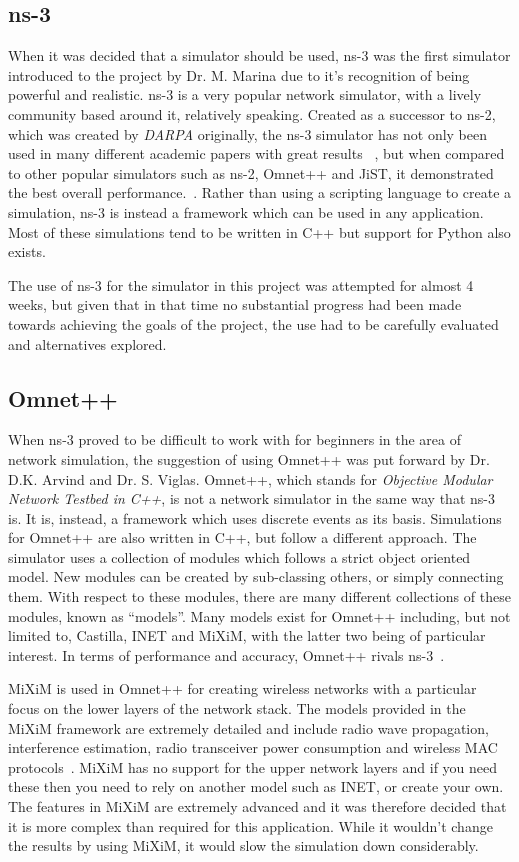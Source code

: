 \documentclass[12pt,a4paper,notitlepage]{article}
\begin{document}
\subsection{ns-3}
When it was decided that a simulator should be used, ns-3 was the first simulator introduced to the project by Dr. M. Marina due to it's recognition of being powerful and realistic. ns-3 is a very popular network simulator, with a lively community based around it, relatively speaking. Created as a successor to ns-2, which was created by \emph{DARPA} originally, the ns-3 simulator has not only been used in many different academic papers with great results ~\cite{highperformancesimulatorofadhocnetworks}, but when compared to other popular simulators such as ns-2, Omnet++ and JiST, it demonstrated the best overall performance.~\cite{networksimulatorcomparison}. Rather than using a scripting language to create a simulation, ns-3 is instead a framework which can be used in any application. Most of these simulations tend to be written in C++ but support for Python also exists. 

The use of ns-3 for the simulator in this project was attempted for almost 4 weeks, but given that in that time no substantial progress had been made towards achieving the goals of the project, the use had to be carefully evaluated and alternatives explored. 

\subsection{Omnet++}
When ns-3 proved to be difficult to work with for beginners in the area of network simulation, the suggestion of using Omnet++ was put forward by Dr. D.K. Arvind and Dr. S. Viglas. Omnet++, which stands for \emph{Objective Modular Network Testbed in C++}, is not a network simulator in the same way that ns-3 is. It is, instead, a framework which uses discrete events as its basis. Simulations for Omnet++ are also written in C++, but follow a different approach. The simulator uses a collection of modules which follows a strict object oriented model. New modules can be created by sub-classing others, or simply connecting them. With respect to these modules, there are many different collections of these modules, known as ``models''. Many models exist for Omnet++ including, but not limited to, Castilla, INET and MiXiM, with the latter two being of particular interest. In terms of performance and accuracy, Omnet++ rivals ns-3~\cite{networksimulatorcomparison}.

MiXiM is used in Omnet++ for creating wireless networks with a particular focus on the lower layers of the network stack. The models provided in the MiXiM framework are extremely detailed and include radio wave propagation, interference estimation, radio transceiver power consumption and wireless MAC protocols~\cite{miximvision}. MiXiM has no support for the upper network layers and if you need these then you need to rely on another model such as INET, or create your own. The features in MiXiM are extremely advanced and it was therefore decided that it is more complex than required for this application. While it wouldn't change the results by using MiXiM, it would slow the simulation down considerably.
\end{document}
